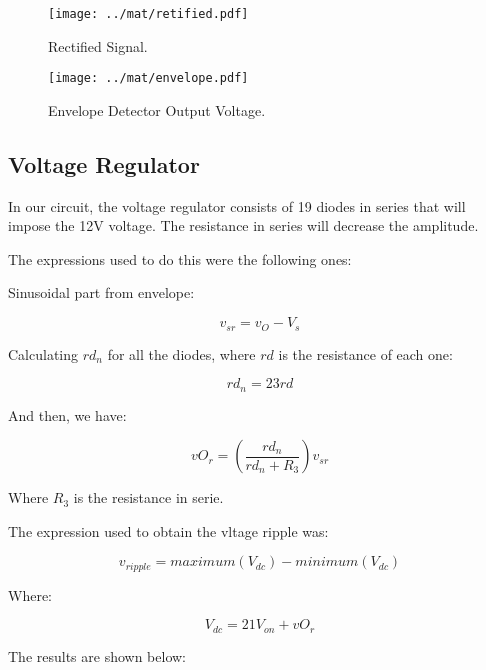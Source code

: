 \begin{figure}[H] \centering
\texttt{[image: ../mat/retified.pdf]}
\caption{Rectified Signal.}
\label{fig:rectified}
\end{figure}

\begin{figure}[H] \centering
\texttt{[image: ../mat/envelope.pdf]}
\caption{Envelope Detector Output Voltage.}
\label{fig:envelopeth}
\end{figure}

\subsection{Voltage Regulator}
In our circuit, the voltage regulator consists of 19 diodes in series that will impose the 12V voltage. The resistance in series will decrease the amplitude.\par
The expressions used to do this were the following ones:\par
Sinusoidal part from envelope:\par
\begin{equation}
    v_{sr} = v_O - V_s
\end{equation}\par
Calculating $rd_{n}$ for all the diodes, where $rd$ is the resistance of each one:\par
\begin{equation}
    rd_n = 23rd
\end{equation}\par
And then, we have: \par
\begin{equation}
    vO_r = (\frac{rd_n}{rd_n + R_3})v_{sr}
\end{equation}\par
Where $R_3$ is the resistance in serie.\par
The expression used to obtain the vltage ripple was: \par
\begin{equation}
    v_{ripple} = maximum(V_{dc})-minimum(V_{dc})
\end{equation}\par
Where: \par
\begin{equation}
    V_{dc} = 21V_{on} + vO_r
\end{equation}\par
The results are shown below:\par

